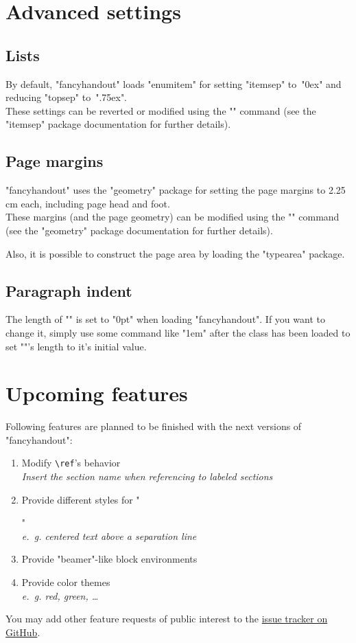 \documentclass[11pt]{ltxdoc}
\begin{document}
	
	
	
	\section{Advanced settings}
	\subsection{Lists}
	By default, "fancyhandout" loads "enumitem" for setting "itemsep" to~"0ex" and reducing "topsep" to~".75ex". \\
	\DescribeMacro{\setlist}
	These settings can be reverted or modified using the "\setlist" command (see the "itemsep" package documentation for further details).
	
	\subsection{Page margins}
	"fancyhandout" uses the "geometry" package for setting the page margins to 2.25\,cm each, including page head and foot. \\
	\DescribeMacro{\geometry}
	These margins (and the page geometry) can be modified using the "\geometry" command (see the "geometry" package documentation for further details).
	
	\smallskip
	Also, it is possible to construct the page area by loading the "typearea" package.
	
	\subsection{Paragraph indent}
	\DescribeMacro{\parindent}
	The length of "\parindent" is set to "0pt" when loading "fancyhandout". If you want to change it, simply use some command like "\parindent 1em" after the class has been loaded to set "\parindent"'s length to it's initial value.
	
	
	
	
	\clearpage
	\section{Upcoming features}
	Following features are planned to be finished with the next versions of "fancyhandout":
	\begin{enumerate}
		\item
			Modify \verb|\ref|'s behavior \\
			\textit{Insert the section name when referencing to labeled sections}
		
		\item
			Provide different styles for "\maketitle" \\
			\textit{e.~g. centered text above a separation line}
		
		\item
			Provide "beamer"-like block environments
		
		\item
			Provide color themes \\
			\textit{e.~g. red, green, …}
	\end{enumerate}
	
	You may add other feature requests of public interest to the \href{https://github.com/SFr682k/fancyhandout/issues}{issue tracker on GitHub}.
\end{document}
